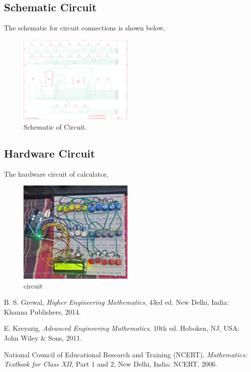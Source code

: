\documentclass[conference]{IEEEtran}
\begin{document}
\subsection{Schematic Circuit}
The schematic for circuit connections is shown below,
\begin{figure}[htbp]
    \centering
    \includegraphics[width=0.5\textwidth]{figs/schematic.png}
    \caption{Schematic of Circuit.}
    \label{fig:circuit_schematic}
\end{figure}


\subsection{Hardware Circuit}
The hardware circuit of calculator,
\begin{figure}[htbp]
    \centering
    \includegraphics[width=0.5\textwidth]{figs/circuit.png}
    \caption{circuit}
    \label{fig:circuit}
\end{figure}


\begin{thebibliography}{00}

B. S. Grewal, \textit{Higher Engineering Mathematics}, 43rd ed. New Delhi, India: Khanna Publishers, 2014.

E. Kreyszig, \textit{Advanced Engineering Mathematics}, 10th ed. Hoboken, NJ, USA: John Wiley \& Sons, 2011.

National Council of Educational Research and Training (NCERT), 
\textit{Mathematics: Textbook for Class XII}, Part 1 and 2, New Delhi, India: NCERT, 2006.

\end{thebibliography}
\end{document}
